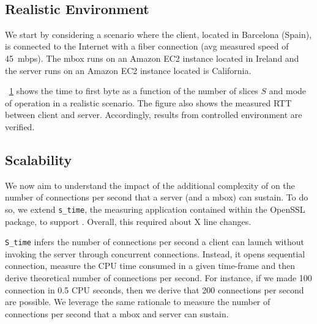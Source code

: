 \documentclass{article}
\begin{document}
\\


\newpage
\subsection{Realistic Environment}
\begin{figure}[t]
\centering
{}
\label{fig:eval_5}
\end{figure}

We start by considering a scenario where the client, located in
Barcelona (Spain), is connected to the Internet with a fiber
connection (avg measured speed of 45~mbps). The mbox runs on an Amazon
EC2 instance located in Ireland and the server runs on an Amazon EC2
instance located is California.

\fig~\ref{fig:eval_5} shows the time to first byte as a function of
the number of slices $S$ and mode of operation in a realistic
scenario. The figure also shows the measured RTT between client and
server. Accordingly, results from controlled environment are verified.


\newpage
\subsection{Scalability}

We now aim to understand the impact of the additional complexity of
\sppmode on the number of connections per second that a server (and a
mbox) can sustain. To do so, we extend \texttt{s\_time}, the measuring
application contained within the OpenSSL package, to support
\sppmode. Overall, this required about X line changes. 

\texttt{S\_time} infers the number of connections per second a client
can launch without invoking the server through concurrent
connections. Instead, it opens sequential connection, measure the CPU
time consumed in a given time-frame and then derive theoretical number
of connections per second. For instance, if we made 100 connection in
0.5 CPU seconds, then we derive that 200 connections per second are
possible. We leverage the same rationale to measure the number of
connections per second that a mbox and server can sustain.
\end{document}
